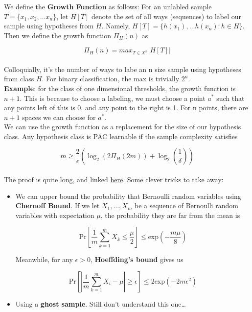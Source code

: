\documentclass[11pt]{article}
\begin{document}
\noindent We define the \textbf{Growth Function} as follows: For an unlabled sample \( T = \{x_{1}, x_{2}, \ldots x_{n}\}  \), let \( H[T] \) denote the set of all ways (sequences) to label our sample using hypotheses from \( H \). 
Namely, \( H[T] = \{h(x_{1}), \ldots h(x_{n}) : h \in H\}  \). Then we define the growth function \( \Pi_{H}(n) \) as 

\[ 
    \Pi_{H}(n) = max_{T \in X^{n}} |H[T]| 
\]
\\
\noindent Colloquially, it's the number of ways to labe an n size sample using hypotheses from class \( H \). For binary classification, the max is trivially \( 2^{n} \). 
\\

\noindent \textbf{Example}: for the class of one dimensional thresholds, the growth function is \( n+1 \). This is because to choose a labeling, we must choose a point \( a^{*} \) such that any points left of this 
is 0, and any point to the right is 1. For n points, there are \( n + 1 \) spaces we can choose for \( a^{*} \). 
\\

\noindent We can use the growth function as a replacement for the size of our hypothesis class. Any hypothesis class is PAC learnable if the sample complexity satisfies

\[ 
    m\geq\frac{2}{\epsilon}\left(\log_{2}{\left( 2\Pi_{H}(2m) \right)} + \log_{2}{\left( \frac{1}{\delta} \right)}\right) 
\]
\\

\noindent The proof is quite long, and linked \href{https://www.cs.umd.edu/~hanshao/848p/3-scub.pdf}{here}. Some clever tricks to take away:
\begin{itemize}
    \item We can upper bound the probability that Bernoulli random variables using \textbf{Chernoff Bound}. If we let \( X_{1},\ldots,X_{m} \) be a sequence of Bernoulli random variables with expectation \( \mu \),
    the probability they are far from the mean is
    
    \[ 
        \text{Pr}\left[\frac{1}{m}\sum_{k=1}^{m}X_{k} \leq \frac{\mu}{2}\right] \leq \text{exp}\left(-\frac{m\mu}{8}\right)
    \]

    Meanwhile, for any \( \epsilon > 0 \), \textbf{Hoeffding's bound} gives us
    
    \[ 
        \text{Pr}\left[\left\lvert\frac{1}{m}\sum_{k=1}^{m}X_{i} - \mu \right\rvert \geq \epsilon \right] \leq 2\text{exp}(-2m\epsilon^{2}) 
    \]

    \item Using a \textbf{ghost sample}. Still don't understand this one\ldots

\end{itemize}
\end{document}
